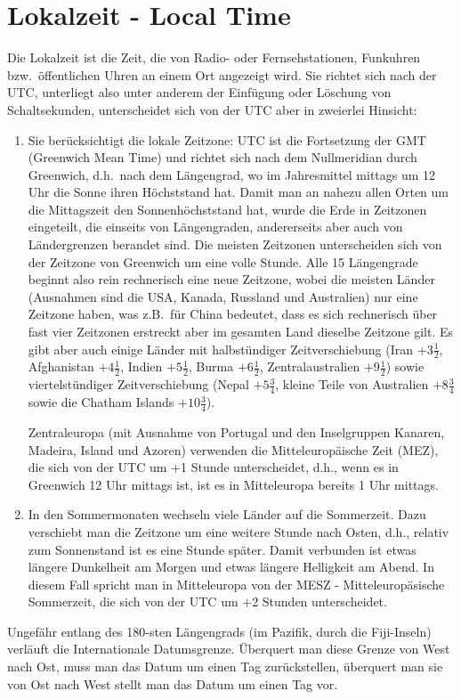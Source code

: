 \section{Lokalzeit - Local Time}

Die Lokalzeit 
ist die Zeit, die von Radio- oder Fernsehstationen, Funkuhren bzw.\ \"offentlichen Uhren
an einem Ort angezeigt wird. Sie richtet sich nach der UTC, unterliegt also unter anderem der 
Einf\"ugung oder L\"oschung von Schaltsekunden, unterscheidet sich von der UTC aber in zweierlei
Hinsicht:
\begin{enumerate}
\item
Sie 
ber\"ucksichtigt die lokale Zeitzone: UTC ist die Fortsetzung der GMT (Greenwich Mean Time) und
richtet sich nach dem Nullmeridian durch Greenwich, d.h.\ nach dem L\"angengrad, wo im Jahresmittel
mittags um 12 Uhr die Sonne ihren H\"ochststand hat. Damit man an nahezu allen Orten um die Mittagszeit
den Sonnenh\"ochststand hat, wurde die Erde in Zeitzonen eingeteilt, die einseits von L\"angengraden,
andererseits aber auch von L\"andergrenzen berandet sind. Die meisten Zeitzonen unterscheiden sich
von der Zeitzone von Greenwich um eine volle Stunde. Alle 15 L\"angengrade beginnt also rein rechnerisch
eine neue Zeitzone, wobei die meisten L\"ander (Ausnahmen sind die USA, Kanada, Russland und
Australien) nur eine Zeitzone haben, was z.B.\ f\"ur China bedeutet, dass es sich rechnerisch \"uber 
fast vier Zeitzonen erstreckt aber im gesamten Land dieselbe Zeitzone gilt. 
Es gibt aber auch einige L\"ander mit halbst\"undiger Zeitverschiebung (Iran $+3\frac{1}{2}$, Afghanistan $+4\frac{1}{2}$,
Indien $+5\frac{1}{2}$, Burma $+6\frac{1}{2}$, Zentralaustralien $+9\frac{1}{2}$) sowie   
viertelst\"undiger Zeitverschiebung (Nepal $+5\frac{3}{4}$, kleine Teile von Australien $+8\frac{3}{4}$
sowie die Chatham Islands $+10\frac{3}{4}$). 

Zentraleuropa (mit Ausnahme von Portugal und
den Inselgruppen Kanaren, Madeira, Island und Azoren) verwenden die Mitteleurop\"aische Zeit (MEZ), die
sich von der UTC um +1 Stunde unterscheidet, d.h., wenn es in Greenwich 12 Uhr mittags ist, ist es in
Mitteleuropa bereits 1 Uhr mittags. 
\item
In den Sommermonaten 
wechseln viele L\"ander auf die Sommerzeit. Dazu verschiebt man die Zeitzone um eine
weitere Stunde nach Osten, d.h., relativ zum Sonnenstand ist es eine Stunde sp\"ater. Damit verbunden ist etwas
l\"angere Dunkelheit am Morgen und etwas l\"angere Helligkeit am Abend. In diesem Fall spricht man in
Mitteleuropa von der 
MESZ - Mitteleurop\"asische Sommerzeit, die sich von der UTC um +2 Stunden unterscheidet.      
\end{enumerate}
Ungef\"ahr entlang des 180-sten L\"angengrads (im Pazifik, durch die Fiji-Inseln) verl\"auft die Internationale Datumsgrenze.
\"Uberquert man diese Grenze von West nach Ost, muss man das Datum um einen Tag zur\"uckstellen, \"uberquert
man sie von Ost nach West stellt man das Datum um einen Tag vor. 

